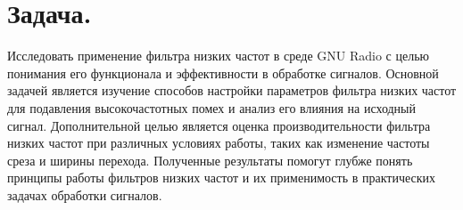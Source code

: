 \documentclass[a4paper,12pt]{extarticle}
\begin{document}


 

\section{Задача.}\label{sec:s1}
Исследовать применение фильтра низких частот в среде GNU Radio с 
целью понимания его функционала и эффективности в обработке сигналов. 
Основной задачей является изучение способов настройки параметров фильтра 
низких частот для подавления высокочастотных помех и анализ его влияния на 
исходный сигнал. Дополнительной целью является оценка производительности 
фильтра низких частот при различных условиях работы, таких как изменение 
частоты среза и ширины перехода. Полученные результаты помогут глубже понять 
принципы работы фильтров низких частот и их применимость в практических задачах 
обработки сигналов.
\end{document}
